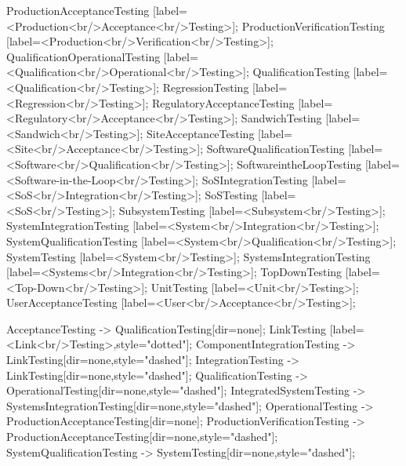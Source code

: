 \documentclass{article}
\begin{document}
{ProductionAcceptanceTesting [label=<Production<br/>Acceptance<br/>Testing>];
ProductionVerificationTesting [label=<Production<br/>Verification<br/>Testing>];
QualificationOperationalTesting [label=<Qualification<br/>Operational<br/>Testing>];
QualificationTesting [label=<Qualification<br/>Testing>];
RegressionTesting [label=<Regression<br/>Testing>];
RegulatoryAcceptanceTesting [label=<Regulatory<br/>Acceptance<br/>Testing>];
SandwichTesting [label=<Sandwich<br/>Testing>];
SiteAcceptanceTesting [label=<Site<br/>Acceptance<br/>Testing>];
SoftwareQualificationTesting [label=<Software<br/>Qualification<br/>Testing>];
SoftwareintheLoopTesting [label=<Software-in-the-Loop<br/>Testing>];
SoSIntegrationTesting [label=<SoS<br/>Integration<br/>Testing>];
SoSTesting [label=<SoS<br/>Testing>];
SubsystemTesting [label=<Subsystem<br/>Testing>];
SystemIntegrationTesting [label=<System<br/>Integration<br/>Testing>];
SystemQualificationTesting [label=<System<br/>Qualification<br/>Testing>];
SystemTesting [label=<System<br/>Testing>];
SystemsIntegrationTesting [label=<Systems<br/>Integration<br/>Testing>];
TopDownTesting [label=<Top-Down<br/>Testing>];
UnitTesting [label=<Unit<br/>Testing>];
UserAcceptanceTesting [label=<User<br/>Acceptance<br/>Testing>];

AcceptanceTesting -> QualificationTesting[dir=none];
LinkTesting [label=<Link<br/>Testing>,style="dotted"];
ComponentIntegrationTesting -> LinkTesting[dir=none,style="dashed"];
IntegrationTesting -> LinkTesting[dir=none,style="dashed"];
QualificationTesting -> OperationalTesting[dir=none,style="dashed"];
IntegratedSystemTesting -> SystemsIntegrationTesting[dir=none,style="dashed"];
OperationalTesting -> ProductionAcceptanceTesting[dir=none];
ProductionVerificationTesting -> ProductionAcceptanceTesting[dir=none,style="dashed"];
SystemQualificationTesting -> SystemTesting[dir=none,style="dashed"];

}
\end{document}
